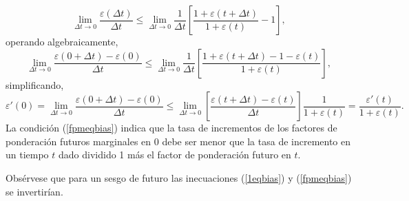 $$\lim_{\Delta t \to 0} \dfrac{\varepsilon (\Delta t)}{\Delta t} \leq \lim_{\Delta t \to 0} \frac{1}{\Delta t} \left[ \dfrac{1+ \varepsilon(t+ \Delta t)}{1+ \varepsilon(t)}-1 \right],$$
operando algebraicamente,
%
$$\lim_{\Delta t \to 0} \dfrac{\varepsilon (0+\Delta t)-\varepsilon (0)}{\Delta t} \leq \lim_{\Delta t \to 0} \frac{1}{\Delta t} \left[ \dfrac{1+ \varepsilon(t+ \Delta t)-1- \varepsilon(t)}{1+ \varepsilon(t)} \right],$$
simplificando,
\begin{equation}
\label{fpmeqbias}
\varepsilon'(0)=\lim_{\Delta t \to 0} \dfrac{\varepsilon (0+\Delta t)-\varepsilon (0)}{\Delta t} \leq \lim_{\Delta t \to 0}  \left[ \dfrac{\varepsilon(t+ \Delta t)- \varepsilon(t)}{\Delta t} \right]\dfrac{1}{1+ \varepsilon(t)}= \dfrac{\varepsilon'(t)}{1+ \varepsilon(t)}.
\end{equation}
La condición (\ref{fpmeqbias}) indica que la tasa de incrementos de los factores de ponderación futuros marginales en 0 debe ser menor que la tasa de incremento en un tiempo $t$ dado dividido 1 más el factor de ponderación futuro en $t$. 

Obsérvese que para un sesgo de futuro las inecuaciones (\ref{1eqbias}) y (\ref{fpmeqbias}) se invertirían. 